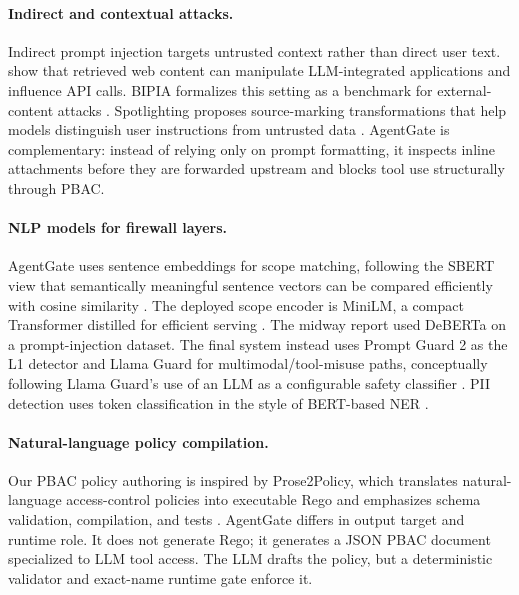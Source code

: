 \documentclass[11pt]{article}
\begin{document}
\paragraph{Indirect and contextual attacks.}
Indirect prompt injection targets untrusted context rather than direct user text. \citet{greshake2023notwhat} show that retrieved web content can manipulate LLM-integrated applications and influence API calls. BIPIA formalizes this setting as a benchmark for external-content attacks \citep{yi2023bipia}. Spotlighting proposes source-marking transformations that help models distinguish user instructions from untrusted data \citep{hines2024spotlighting}. AgentGate is complementary: instead of relying only on prompt formatting, it inspects inline attachments before they are forwarded upstream and blocks tool use structurally through PBAC.

\paragraph{NLP models for firewall layers.}
AgentGate uses sentence embeddings for scope matching, following the SBERT view that semantically meaningful sentence vectors can be compared efficiently with cosine similarity \citep{reimers2019sentencebert}. The deployed scope encoder is MiniLM, a compact Transformer distilled for efficient serving \citep{wang2020minilm,vaswani2017attention}. The midway report used DeBERTa \citep{he2021deberta} on a prompt-injection dataset. The final system instead uses Prompt Guard 2 as the L1 detector and Llama Guard for multimodal/tool-misuse paths, conceptually following Llama Guard's use of an LLM as a configurable safety classifier \citep{inan2023llamaguard,grattafiori2024llama3}. PII detection uses token classification in the style of BERT-based NER \citep{devlin2019bert,tjong2003conll}.

\paragraph{Natural-language policy compilation.}
Our PBAC policy authoring is inspired by Prose2Policy, which translates natural-language access-control policies into executable Rego and emphasizes schema validation, compilation, and tests \citep{gupta2026prose2policy}. AgentGate differs in output target and runtime role. It does not generate Rego; it generates a JSON PBAC document specialized to LLM tool access. The LLM drafts the policy, but a deterministic validator and exact-name runtime gate enforce it.
\end{document}
